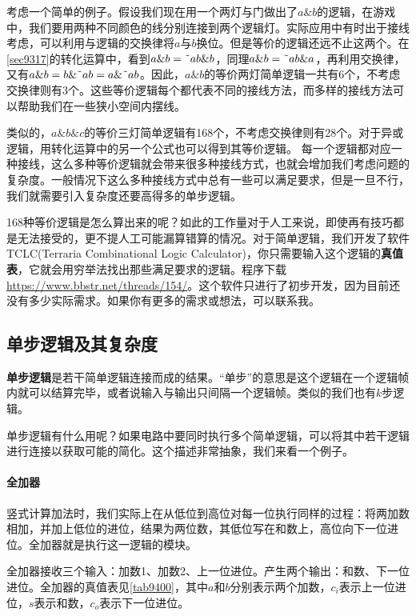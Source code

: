 考虑一个简单的例子。假设我们现在用一个两灯与门做出了$a\&b$的逻辑，在游戏中，我们要用两种不同颜色的线分别连接到两个逻辑灯。实际应用中有时出于接线考虑，可以利用与逻辑的交换律将$a$与$b$换位。但是等价的逻辑还远不止这两个。在\autoref{sec9317}的转化运算中，看到$a\&b=\textrm{\~{}} ab\&b$，同理$a\&b=\textrm{\~{}} ab\&a$，再利用交换律，又有$a\&b=b\&\textrm{\~{}} ab=a\&\textrm{\~{}} ab$。因此，$a\&b$的等价两灯简单逻辑一共有6个，不考虑交换律则有3个。这些等价逻辑每个都代表不同的接线方法，而多样的接线方法可以帮助我们在一些狭小空间内摆线。

类似的，$a\&b\&c$的等价三灯简单逻辑有168个，不考虑交换律则有28个。对于异或逻辑，用转化运算中的另一个公式也可以得到其等价逻辑。
每一个逻辑都对应一种接线，这么多种等价逻辑就会带来很多种接线方式，也就会增加我们考虑问题的复杂度。一般情况下这么多种接线方式中总有一些可以满足要求，但是一旦不行，我们就需要引入复杂度还要高得多的单步逻辑。

168种等价逻辑是怎么算出来的呢？如此的工作量对于人工来说，即使再有技巧都是无法接受的，更不提人工可能漏算错算的情况。对于简单逻辑，我们开发了软件TCLC(Terraria Combinational Logic Calculator)，你只需要输入这个逻辑的\textbf{真值表}，它就会用穷举法找出那些满足要求的逻辑。程序下载\url{https://www.bbstr.net/threads/154/}。这个软件只进行了初步开发，因为目前还没有多少实际需求。如果你有更多的需求或想法，可以联系我。

\subsection{单步逻辑及其复杂度}
\textbf{单步逻辑}是若干简单逻辑连接而成的结果。“单步”的意思是这个逻辑在一个逻辑帧内就可以结算完毕，或者说输入与输出只间隔一个逻辑帧。类似的我们也有$k$步逻辑。

单步逻辑有什么用呢？如果电路中要同时执行多个简单逻辑，可以将其中若干逻辑进行连接以获取可能的简化。这个描述非常抽象，我们来看一个例子。

\paragraph*{全加器}

竖式计算加法时，我们实际上在从低位到高位对每一位执行同样的过程：将两加数相加，并加上低位的进位，结果为两位数，其低位写在和数上，高位向下一位进位。全加器就是执行这一逻辑的模块。

全加器接收三个输入：加数1、加数2、上一位进位。产生两个输出：和数、下一位进位。全加器的真值表见\autoref{tab9400}，其中$a$和$b$分别表示两个加数，$c_i$表示上一位进位，$s$表示和数，$c_o$表示下一位进位。

